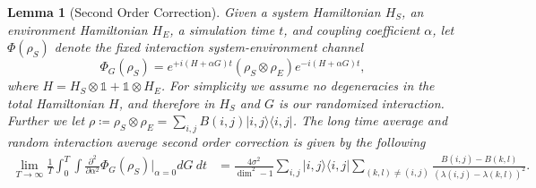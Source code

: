 \documentclass{article}
\newtheorem{lemma}[theorem]{Lemma}
\newcommand{\ketbra}[2]{| #1\rangle\! \langle #2|}
\newcommand{\identity}{\mathds{1}}
\begin{document}
\begin{lemma}[Second Order Correction]
    Given a system Hamiltonian $H_{S}$, an environment Hamiltonian $H_{E}$, a simulation time $t$, and coupling coefficient $\alpha$, let $\Phi(\rho_S)$ denote the fixed interaction system-environment channel 
    \begin{equation}
        \Phi_G(\rho_S) = e^{+i (H + \alpha G)t} (\rho_S \otimes \rho_E) e^{-i (H + \alpha G)t},
    \end{equation}
    where $H = H_S \otimes \identity + \identity \otimes H_E$. For simplicity we assume no degeneracies in the total Hamiltonian $H$, and therefore in $H_S$ and $G$ is our randomized interaction. Further we let $\rho \coloneqq \rho_S \otimes \rho_E = \sum_{i,j} B(i,j) \ketbra{i,j}{i,j}$. The long time average and random interaction average second order correction is given by the following
    \begin{align}
        \lim_{T \to \infty} \frac{1}{T} \int_0^T \int \frac{\partial^2}{\partial \alpha^2} \Phi_G(\rho_S)\bigg|_{\alpha = 0} dG ~dt &=  \frac{4 \sigma^2}{\dim^2 - 1} \sum_{i,j} \ketbra{i,j}{i,j} \sum_{(k,l) \neq (i,j)} \frac{B(i,j) - B(k,l)}{(\lambda(i,j) - \lambda(k,l))^2}.
    \end{align}
\end{lemma}
\end{document}

